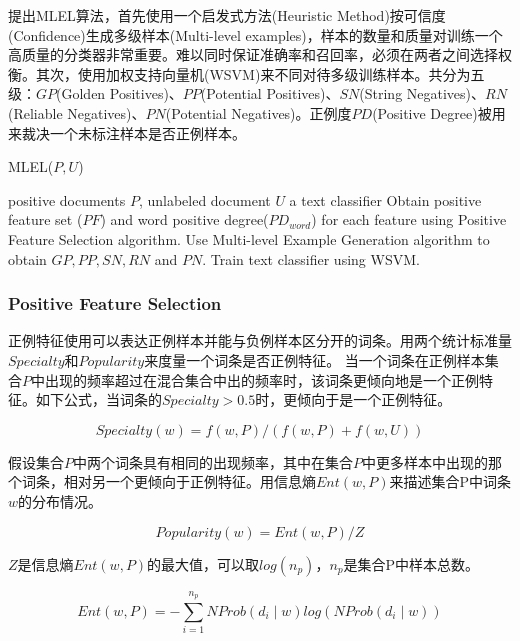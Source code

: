
\citet{AAAI113583}提出MLEL算法\cite{AAAI113583}，首先使用一个启发式方法(Heuristic Method)按可信度(Confidence)生成多级样本(Multi-level examples)，样本的数量和质量对训练一个高质量的分类器非常重要。难以同时保证准确率和召回率，必须在两者之间选择权衡。其次，使用加权支持向量机(WSVM)来不同对待多级训练样本。共分为五级：$GP$(Golden Positives)、$PP$(Potential Positives)、$SN$(String Negatives)、$RN$(Reliable Negatives)、$PN$(Potential
Negatives)。正例度$PD$(Positive Degree)被用来裁决一个未标注样本是否正例样本。

\begin{algorithm}[htb]
\caption{MLEL($P,U$)}
\label{alg:MLEL}
\begin{algorithmic}[1]
\REQUIRE positive documents $P$, unlabeled document $U$
\ENSURE a text classifier
\STATE Obtain positive feature set ($PF$) and word positive
\STATE degree($PD_{word}$) for each feature using Positive Feature
\STATE Selection algorithm.
\STATE Use Multi-level Example Generation algorithm to
\STATE obtain $GP, PP, SN, RN$ and $PN$.
\STATE Train text classifier using WSVM.
\RETURN 
\end{algorithmic}
\end{algorithm}

\subsubsection{Positive Feature Selection}
正例特征使用可以表达正例样本并能与负例样本区分开的词条。用两个统计标准量$Specialty$和$Popularity$来度量一个词条是否正例特征。
当一个词条在正例样本集合$P$中出现的频率超过在混合集合中出的频率时，该词条更倾向地是一个正例特征。如下公式，当词条的$Specialty > 0.5$时，更倾向于是一个正例特征。

\begin{equation}
Specialty(w) = f(w,P)/(f(w,P) + f(w,U))
\end{equation}

假设集合$P$中两个词条具有相同的出现频率，其中在集合$P$中更多样本中出现的那个词条，相对另一个更倾向于正例特征。用信息熵$Ent(w,P)$来描述集合P中词条$w$的分布情况。

\begin{equation}
Popularity(w) = Ent(w,P) / Z
\end{equation}

$Z$是信息熵$Ent(w,P)$的最大值，可以取$log(n_p)$，$n_p$是集合P中样本总数。

\begin{equation}
Ent(w,P) = -\sum\limits_{i=1}^{n_p}NProb(d_i \mid w)log(NProb(d_i \mid w))
\end{equation}

